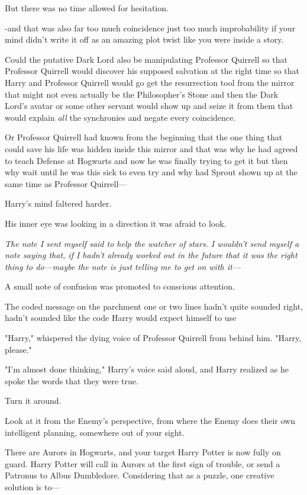 But there was no time allowed for hesitation.

-and that was also far too much coincidence just too much improbability if your
mind didn't write it off as an amazing plot twist like you were inside a story.

Could the putative Dark Lord also be manipulating Professor Quirrell so that
Professor Quirrell would discover his supposed salvation at the right time so
that Harry and Professor Quirrell would go get the resurrection tool from the
mirror that might not even actually be the Philosopher's Stone and then the
Dark Lord's avatar or some other servant would show up and seize it from them
that would explain \emph{all} the synchronies and negate every coincidence.

Or Professor Quirrell had known from the beginning that the one thing that
could save his life was hidden inside this mirror and that was why he had
agreed to teach Defense at Hogwarts and now he was finally trying to get it but
then why wait until he was this sick to even try and why had Sprout shown up at
the same time as Professor Quirrell—

Harry's mind faltered harder.

His inner eye was looking in a direction it was afraid to look.

\emph{The note I sent myself said to help the watcher of stars. I wouldn't send
myself a note saying that, if I hadn't already worked out in the future that it
was the right thing to do—maybe the note is just telling me to get on with
it—}

A small note of confusion was promoted to conscious attention.

The coded message on the parchment{\el} one or two lines hadn't quite
sounded right, hadn't sounded like the code Harry would expect himself to
use{\el}

"Harry," whispered the dying voice of Professor Quirrell from behind him.
"Harry, please."

"I'm almost done thinking," Harry's voice said aloud, and Harry realized as he
spoke the words that they were true.

Turn it around.

Look at it from the Enemy's perspective, from where the Enemy does their own
intelligent planning, somewhere out of your sight.

There are Aurors in Hogwarts, and your target Harry Potter is now fully on
guard. Harry Potter will call in Aurors at the first sign of trouble, or send a
Patronus to Albus Dumbledore. Considering that as a puzzle, one creative
solution is to—

